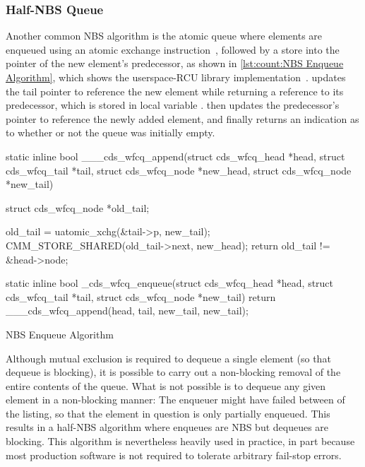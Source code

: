 \fi

\subsubsection{Half-NBS Queue}
\label{sec:advsync:Half-NBS Queue}

\begin{fcvref}
Another common NBS algorithm is the atomic queue where elements are
enqueued using an atomic exchange instruction~\cite{MagedMichael1993JPDC},
followed by a store into the  pointer of the new element's
predecessor, as shown in \cref{lst:count:NBS Enqueue Algorithm},
which shows the userspace-RCU library
implementation~\cite{MathieuDesnoyers2009URCU}.
 updates the tail pointer to reference the new element while
returning a reference to its predecessor, which is stored in
local variable .
 then updates the predecessor's  pointer to
reference the newly added element, and finally 
returns an indication as to whether or not the queue was initially
empty.

\begin{listing}[tbp]
\begin{fcvlabel}
\begin{VerbatimL}[commandchars=\\\[\]]
static inline bool
___cds_wfcq_append(struct cds_wfcq_head *head,
                   struct cds_wfcq_tail *tail,
                   struct cds_wfcq_node *new_head,
                   struct cds_wfcq_node *new_tail)
{
	struct cds_wfcq_node *old_tail;

	old_tail = uatomic_xchg(&tail->p, new_tail);	\lnlbl[tail]
	CMM_STORE_SHARED(old_tail->next, new_head);     \lnlbl[pred]
	return old_tail != &head->node;			\lnlbl[ret]
}

static inline bool
_cds_wfcq_enqueue(struct cds_wfcq_head *head,
                  struct cds_wfcq_tail *tail,
                  struct cds_wfcq_node *new_tail)
{
	return ___cds_wfcq_append(head, tail,
	                          new_tail, new_tail);
}
\end{VerbatimL}
\end{fcvlabel}
\caption{NBS Enqueue Algorithm}
\label{lst:count:NBS Enqueue Algorithm}
\end{listing}

Although mutual exclusion is required to dequeue a single element
(so that dequeue is blocking), it is possible to carry out a non-blocking
removal of the entire contents of the queue.
What is not possible is to dequeue any given element in a non-blocking
manner: The enqueuer might have failed between  of the
listing, so that the element in question is only partially enqueued.
This results in a half-NBS algorithm where enqueues are NBS but
dequeues are blocking.
This algorithm is nevertheless heavily used in practice, in part because
most production software is not required to tolerate arbitrary fail-stop
errors.
\end{fcvref}

